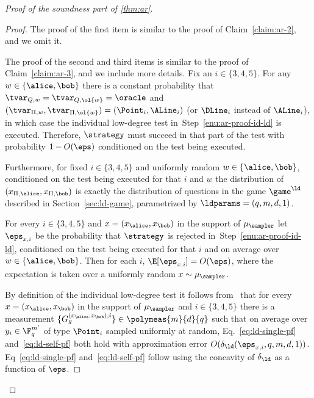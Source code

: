 \begin{proof}[Proof of the soundness part of \cref{thm:ar}]
\begin{claim}
\end{claim}
	
	\begin{proof} 
    The proof of the first item is similar to the proof of
    Claim~\ref{claim:ar-2}, and we omit it.

    The proof of the second and third items is similar to the proof of
    Claim~\ref{claim:ar-3}, and we include more details.
    Fix an $i\in\{3,4,5\}$.
    For any $w\in\{\alice,\bob\}$ there is a constant probability that
    $\tvar_{Q,w} = \tvar_{Q,\ol{w}} = \oracle$ and $(\tvar_{\Pi,w}, \tvar_{\Pi,
      \ol{w}}) = (\Point_i, \ALine_i)$ (or $\DLine_i$ instead of $\ALine_i$), in
    which case the individual low-degree test in~Step~\ref{enu:ar-proof-id-ld}
    is executed.
    Therefore, $\strategy$ must succeed in that part of the test with
    probability $1-O(\eps)$ conditioned on the test being executed.
					
    Furthermore, for fixed $i\in \{3,4,5\}$ and uniformly random
    $w\in\{\alice,\bob\}$, conditioned on the test being executed for that $i$
    and $w$ the distribution of $(x_{\Pi,\alice},x_{\Pi,\bob})$ is exactly the
    distribution of questions in the game $\game^\ld$ described in
    Section~\ref{sec:ld-game}, parametrized by $\ldparams = (q, m, d, 1)$.
			
    For every $i\in\{3,4,5\}$ and $x=(x_\alice,x_\bob)$ in the support of
    $\mu_\sampler$ let $\eps_{x,i}$ be the probability that $\strategy$ is
    rejected in~Step~\ref{enu:ar-proof-id-ld}, conditioned on the test being
    executed for that $i$ and on average over $w\in\{\alice,\bob\}$.
    Then for each $i$, $\E[\eps_{x,i}] = O(\eps)$, where the expectation is
    taken over a uniformly random $x\sim \mu_\sampler$.

    By definition of the individual low-degree test it follows
    from~ that for every $x=(x_\alice,x_\bob)$ in the
    support of $\mu_\sampler$ and $i\in\{3,4,5\}$ there is a measurement
    $\{G^{({x}_\alice, {x}_\bob), i}_{g}\} \in \polymeas{m}{d}{q}$ such that on
    average over $y_i\in \F_q^{m'}$ of type $\Point_i$ sampled uniformly at
    random, Eq.~\eqref{eq:ld-single-pf} and~\eqref{eq:ld-self-pf} both hold with
    approximation error $O(\delta_{\ld}(\eps_{x,i},q,m,d,1))$.
    Eq~\eqref{eq:ld-single-pf} and~\eqref{eq:ld-self-pf} follow using the concavity
    of $\delta_{\ld}$ as a function of $\eps$.


\end{proof}
\end{proof}
